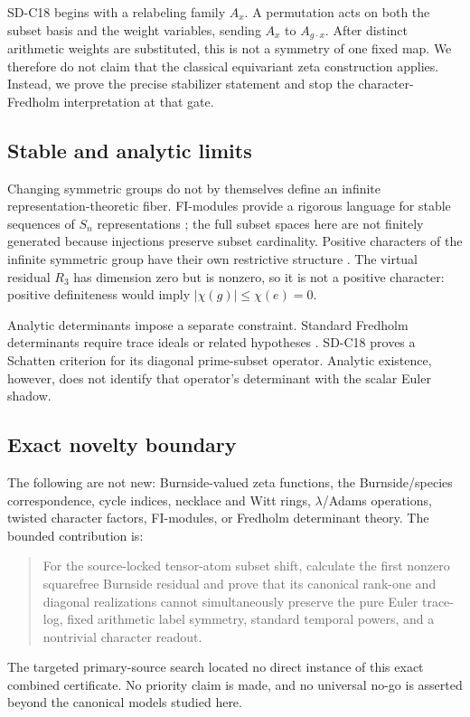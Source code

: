SD-C18 begins with a relabeling family $A_x$.  A permutation acts on both the
subset basis and the weight variables, sending $A_x$ to $A_{g\cdot x}$.
After distinct arithmetic weights are substituted, this is not a symmetry of
one fixed map.  We therefore do not claim that the classical equivariant zeta
construction applies.  Instead, we prove the precise stabilizer statement
and stop the character-Fredholm interpretation at that gate.

\subsection{Stable and analytic limits}

Changing symmetric groups do not by themselves define an infinite
representation-theoretic fiber.  FI-modules provide a rigorous language for
stable sequences of $S_n$ representations
\citep{ChurchEllenbergFarb2015FI}; the full subset spaces here are not
finitely generated because injections preserve subset cardinality.  Positive
characters of the infinite symmetric group have their own restrictive
structure \citep{Thoma1964InfiniteSymmetric}.  The virtual residual
$R_3$ has dimension zero but is nonzero, so it is not a positive character:
positive definiteness would imply $|\chi(g)|\le\chi(e)=0$.

Analytic determinants impose a separate constraint.  Standard Fredholm
determinants require trace ideals or related hypotheses
\citep{Simon1977InfiniteDeterminants}.  SD-C18 proves a Schatten criterion
for its diagonal prime-subset operator.  Analytic existence, however, does
not identify that operator's determinant with the scalar Euler shadow.

\subsection{Exact novelty boundary}

The following are not new: Burnside-valued zeta functions, the
Burnside/species correspondence, cycle indices, necklace and Witt rings,
$\lambda$/Adams operations, twisted character factors, FI-modules, or
Fredholm determinant theory.  The bounded contribution is:

\begin{quote}
For the source-locked tensor-atom subset shift, calculate the first nonzero
squarefree Burnside residual and prove that its canonical rank-one and
diagonal realizations cannot simultaneously preserve the pure Euler
trace-log, fixed arithmetic label symmetry, standard temporal powers, and a
nontrivial character readout.
\end{quote}

The targeted primary-source search located no direct instance of this exact
combined certificate.  No priority claim is made, and no universal no-go is
asserted beyond the canonical models studied here.

